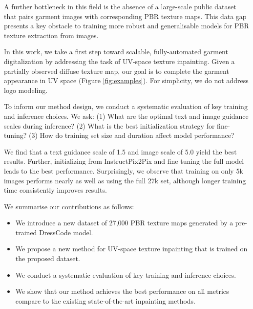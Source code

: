 \documentclass[11pt,twocolumn]{article}
\begin{document}
A further bottleneck in this field is the absence of a large-scale public dataset that pairs 
garment images with corresponding PBR texture maps. This data gap presents a key obstacle to 
training more robust and generalisable models for PBR texture extraction from images.

In this work, we take a first step toward scalable, fully-automated garment digitalization by addressing the 
task of UV-space texture inpainting. Given a partially observed diffuse texture map, our goal is to complete 
the garment appearance in UV space (Figure \ref{fig:examples}). For simplicity, we do not address logo modeling.

To inform our method design, we conduct a systematic evaluation of key training and inference choices. 
We ask: (1) What are the optimal text and image guidance scales during inference? (2) What is the best initialization strategy for fine-tuning? (3) 
How do training set size and duration affect model performance?

We find that a text guidance scale of 1.5 and image scale of 5.0 yield the best results. 
Further, initializing from InstructPix2Pix and fine tuning the full model leads to the best performance. 
Surprisingly, we observe that training on only 5k images performs nearly as well as using the full 27k set, 
although longer training time consistently improves results.

We summarise our contributions as follows:
\begin{itemize}[itemsep=2pt, topsep=2pt]
  \item We introduce a new dataset of 27{,}000 PBR texture maps generated by a pre-trained DressCode \cite{dresscode} model.
  \item We propose a new method for UV-space texture inpainting that is trained on the proposed dataset.
  \item We conduct a systematic evaluation of key training and inference choices.
  \item We show that our method achieves the best performance on all metrics compare to the existing state-of-the-art inpainting methods.
\end{itemize}
\end{document}
